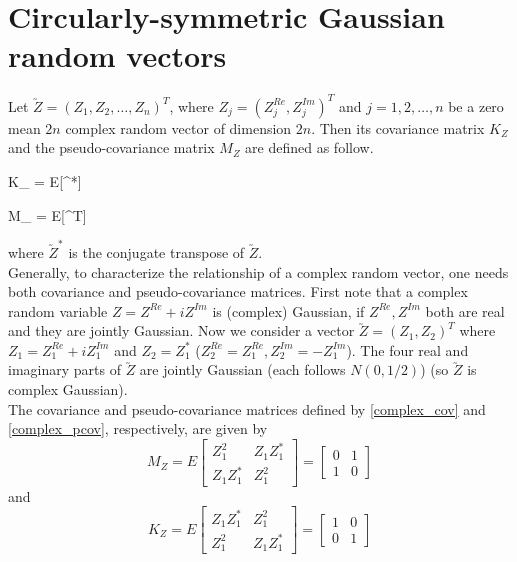 \section{Circularly-symmetric Gaussian random vectors}

Let $\utilde{Z} = (Z_1, Z_2, \ldots, Z_n)^T$, where $Z_j = (Z_j^{Re}, Z_j^{Im})^T$ and $j=1,2,\ldots, n$ be a zero mean $2n$ complex random vector of dimension $2n$. Then its covariance matrix $K_Z$ and the pseudo-covariance matrix $M_Z$ are defined as follow.

\beq \label{complex_cov}
K_{} = E[^*]
\eeq

\beq \label{complex_pcov}
M_{} = E[^T]
\eeq

where $\utilde{Z}^*$ is the conjugate transpose of $\utilde{Z}$.\\

Generally, to characterize the relationship of a complex random vector, one needs both covariance and pseudo-covariance matrices. First note that a complex random variable $Z = Z^{Re} + iZ^{Im}$ is (complex) Gaussian, if $Z^{Re}, Z^{Im}$ both are real and they are jointly Gaussian. Now we consider a vector $\utilde{Z}=(Z_1, Z_2)^T$ where $Z_1=Z_1^{Re }+i Z_1^{Im}$ and $Z_2=Z_1^*$ ($Z_2^{Re}=Z_1^{Re }, Z_2^{Im}=-Z_1^{Im}$). The four real and imaginary parts of $\utilde{Z}$ are jointly Gaussian (each follows $N(0,1/2)$) (so $\utilde{Z}$ is complex Gaussian). \\

The covariance and pseudo-covariance matrices defined by \ref{complex_cov} and \ref{complex_pcov}, respectively, are given by\\
\[
M_Z = E \begin{bmatrix}
Z_1^2 & Z_1Z_1^*\\
Z_1Z_1^* & Z_1^2
\end{bmatrix} =
\begin{bmatrix}
0 & 1\\
1 & 0
\end{bmatrix}
\]
and
\[
K_Z= E \begin{bmatrix}
Z_1Z_1^*  & Z_1^2\\
Z_1^2     & Z_1Z_1^*
\end{bmatrix} =
\begin{bmatrix}
1 & 0\\
0 & 1
\end{bmatrix}
\]

